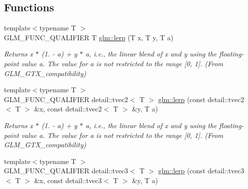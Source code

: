 \subsection*{Functions}
\begin{DoxyCompactItemize}
\item 
\hypertarget{group__gtx__compatibility_ga5494ba3a95ea6594c86fc75236886864}{}{\footnotesize template$<$typename T $>$ }\\G\+L\+M\+\_\+\+F\+U\+N\+C\+\_\+\+Q\+U\+A\+L\+I\+F\+I\+E\+R T \hyperlink{group__gtx__compatibility_ga5494ba3a95ea6594c86fc75236886864}{glm\+::lerp} (T x, T y, T a)\label{group__gtx__compatibility_ga5494ba3a95ea6594c86fc75236886864}

\begin{DoxyCompactList}\small\item\em Returns x $\ast$ (1. -\/ a) + y $\ast$ a, i.\+e., the linear blend of x and y using the floating-\/point value a. The value for a is not restricted to the range \mbox{[}0, 1\mbox{]}. (From G\+L\+M\+\_\+\+G\+T\+X\+\_\+compatibility) \end{DoxyCompactList}\item 
\hypertarget{group__gtx__compatibility_ga27390ee6e4797335f0a751e021038a41}{}{\footnotesize template$<$typename T $>$ }\\G\+L\+M\+\_\+\+F\+U\+N\+C\+\_\+\+Q\+U\+A\+L\+I\+F\+I\+E\+R detail\+::tvec2$<$ T $>$ \hyperlink{group__gtx__compatibility_ga27390ee6e4797335f0a751e021038a41}{glm\+::lerp} (const detail\+::tvec2$<$ T $>$ \&x, const detail\+::tvec2$<$ T $>$ \&y, T a)\label{group__gtx__compatibility_ga27390ee6e4797335f0a751e021038a41}

\begin{DoxyCompactList}\small\item\em Returns x $\ast$ (1. -\/ a) + y $\ast$ a, i.\+e., the linear blend of x and y using the floating-\/point value a. The value for a is not restricted to the range \mbox{[}0, 1\mbox{]}. (From G\+L\+M\+\_\+\+G\+T\+X\+\_\+compatibility) \end{DoxyCompactList}\item 
\hypertarget{group__gtx__compatibility_gaf2ca5584fe9c3a2e5e5b12bbfcecfe38}{}{\footnotesize template$<$typename T $>$ }\\G\+L\+M\+\_\+\+F\+U\+N\+C\+\_\+\+Q\+U\+A\+L\+I\+F\+I\+E\+R detail\+::tvec3$<$ T $>$ \hyperlink{group__gtx__compatibility_gaf2ca5584fe9c3a2e5e5b12bbfcecfe38}{glm\+::lerp} (const detail\+::tvec3$<$ T $>$ \&x, const detail\+::tvec3$<$ T $>$ \&y, T a)\label{group__gtx__compatibility_gaf2ca5584fe9c3a2e5e5b12bbfcecfe38}


\end{DoxyCompactItemize}
